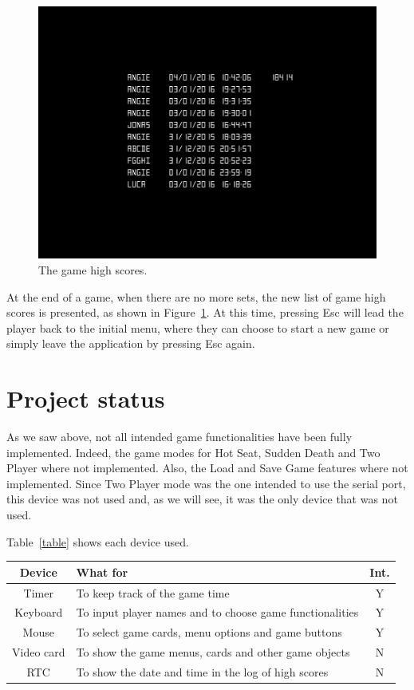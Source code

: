 \documentclass[11pt,a4paper,reqno]{report}
\numberwithin{equation}{section}
\begin{document}
\begin{figure}[htbp]
\begin{center}
\includegraphics[scale=0.3]{game_score.png}
\caption{The game high scores.}
\label{game_score}
\end{center}
\end{figure}

At the end of a game, when there are no more sets, the new list of game high scores is presented, as shown in Figure~\ref{game_score}. At this time, pressing Esc will lead the player back to the initial menu, where they can choose to start a new game or simply leave the application by pressing Esc again.

\chapter{Project status}

As we saw above, not all intended game functionalities have been fully implemented. Indeed, the game modes for Hot Seat, Sudden Death and Two Player where not implemented. Also, the Load and Save Game features where not implemented. Since Two Player mode was the one intended to use the serial port, this device was not used and, as we will see, it was the only device that was not used.

Table~\ref{table} shows each device used.

\begin{center}
\begin{tabular}{ | c | l | c | }
	\hline
	Device 	&	What for	&	Int.	\\\hline
	Timer 	&	To keep track of the game time	&	Y	\\\hline
	Keyboard	&	To input player names and to choose game functionalities	&	Y	\\\hline
	Mouse	&	To select game cards, menu options and game buttons	&	Y	\\\hline
	Video card	&	To show the game menus, cards and other game objects	&	N		\\\hline
	RTC	&	To show the date and time in the log of high scores	&	N	\\\hline
\end{tabular}
\label{table}
\end{center}
\end{document}
